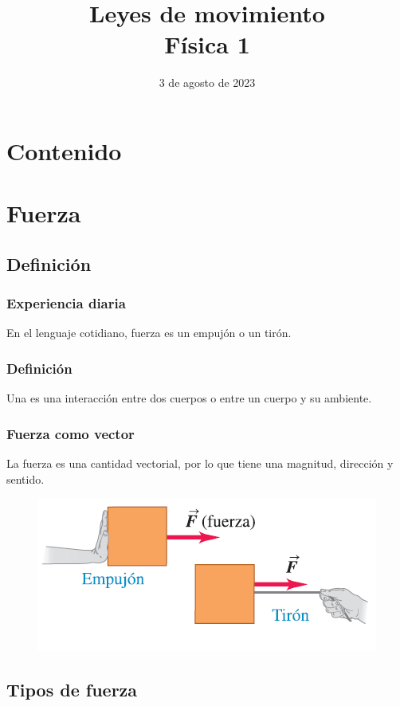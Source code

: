\documentclass[14pt]{beamer}
\title{\Large{Leyes de movimiento} \\ \normalsize{Física 1}}
\date{3 de agosto de 2023}
\begin{document}
\maketitle

\section*{Contenido}


\section{Fuerza}
\subsection{Definición}

\begin{frame}
\frametitle{Experiencia diaria}
En el lenguaje cotidiano, fuerza es un empujón o un tirón.
\end{frame}
\begin{frame}
\frametitle{Definición}
Una  es una interacción entre dos cuerpos o entre un cuerpo y su ambiente.
\end{frame}
\begin{frame}
\frametitle{Fuerza como vector}
La fuerza es una cantidad vectorial, por lo que tiene una magnitud, dirección y sentido.
\begin{figure}
    \centering
    \includegraphics[scale=0.8]{Imagenes/Fuerza_01.png}
\end{figure}
\end{frame}

\subsection{Tipos de fuerza}
\end{document}
